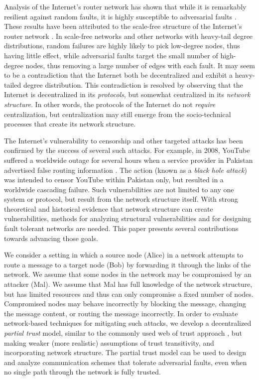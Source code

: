 \documentclass{sig-alternate-05-2015}
\begin{document}
Analysis of the Internet's router network has shown that while it is remarkably
resilient against random faults,
it is highly susceptible to adversarial faults \cite{albert_error_2000}.
These results have been attributed to the scale-free structure of the Internet's
router network
\cite{barabasi_emergence_1999,barabasi_scale-free_2009}.
In scale-free networks and other networks with heavy-tail degree distributions,
random failures are highly likely to pick low-degree nodes, thus having
little effect,
while adversarial faults target the small number of high-degree nodes,
thus removing a large number of edges with each fault.
It may seem to be a contradiction that the Internet both be decentralized
and exhibit a heavy-tailed degree distribution.
This contradiction is resolved by observing that the Internet is decentralized
in its {\em protocols}, but somewhat centralized in its {\em network structure}.
In other words, the protocols of the Internet do not {\em require}
centralization, but centralization may still emerge from the socio-technical
processes that create its network structure.

The Internet's vulnerability to censorship and other targeted attacks
has been confirmed by the success of several such attacks.
For example, in 2008, YouTube suffered a worldwide outage for several hours
when a service provider in Pakistan advertised false routing information
\cite{hunter_pakistan_2008}.
The action (known as a {\em black hole attack}) was intended to censor YouTube
within Pakistan only, but resulted in a worldwide cascading failure.
Such vulnerabilities are not limited to any one system or protocol,
but result from the network structure itself.
With strong theoretical and historical evidence that network structure
can create vulnerabilities,
methods for analyzing structural vulnerabilities and for designing
fault tolerant networks are needed.
This paper presents several contributions towards advancing those goals.

We consider a setting in which a source node (Alice)
in a network attempts to route a message
to a target node (Bob) by forwarding it through the links of the network.
We assume that some nodes in the network may be compromised by an attacker
(Mal).
We assume that Mal has full knowledge of the network structure, but has
limited resources and thus can only compromise a fixed number of nodes.
Compromised nodes may behave incorrectly by blocking the message,
changing the message content, or routing the message incorrectly.
In order to evaluate network-based techniques for mitigating such attacks,
we develop a decentralized {\em partial trust} model,
similar to the commonly used web of trust approach
\cite{zimmermann_official_1995,ferguson_practical_2003},
but making weaker (more realistic) assumptions of trust transitivity,
and incorporating network structure.
The partial trust model can be used to design and analyze communication
schemes that tolerate adversarial faults,
even when no single path through the network is fully trusted.
\end{document}
